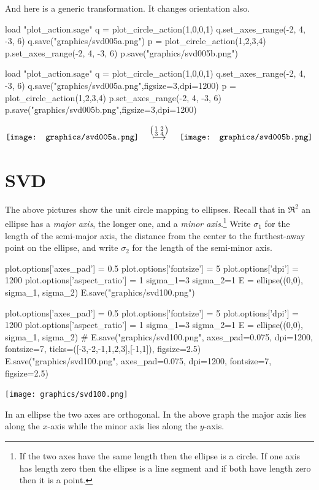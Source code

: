 And here is a generic transformation.
It changes orientation also.
\begin{sageoutput}[d,0,4;d,5,7]
load "plot_action.sage"
q = plot_circle_action(1,0,0,1) 
q.set_axes_range(-2, 4, -3, 6) 
q.save("graphics/svd005a.png")
p = plot_circle_action(1,2,3,4) 
p.set_axes_range(-2, 4, -3, 6) 
p.save("graphics/svd005b.png")
\end{sageoutput}
\begin{sagesilent}
load "plot_action.sage"
q = plot_circle_action(1,0,0,1) 
q.set_axes_range(-2, 4, -3, 6) 
q.save("graphics/svd005a.png",figsize=3,dpi=1200)
p = plot_circle_action(1,2,3,4) 
p.set_axes_range(-2, 4, -3, 6) 
p.save("graphics/svd005b.png",figsize=3,dpi=1200)
\end{sagesilent}
\begin{equation*}
  \vcenteredhbox{\texttt{[image: graphics/svd005a.png]}}
  \quad\mapsunder{\big (\begin{smallmatrix} 1 &2 \\ 3 &4 \end{smallmatrix}\big )}\quad
  \vcenteredhbox{\texttt{[image: graphics/svd005b.png]}}
\end{equation*}



\section{SVD}
The above pictures show the unit circle mapping to ellipses.
Recall that in $\Re^2$ an ellipse has a \textit{major axis}, 
the longer one, and a 
\textit{minor axis}.\footnote{If the two axes have the same length 
then the ellipse is a circle.
If one axis has length zero then the ellipse is a line segment 
and if both have length zero then it is a point.}
Write $\sigma_1$ for the length of the semi-major axis, 
the distance from the center to the furthest-away point on the ellipse,
and write $\sigma_2$ for the length of the semi-minor axis.
\begin{sageoutput}[d,0,4]
plot.options['axes_pad'] = 0.5
plot.options['fontsize'] = 5
plot.options['dpi'] = 1200
plot.options['aspect_ratio'] = 1
sigma_1=3
sigma_2=1
E = ellipse((0,0), sigma_1, sigma_2)
E.save("graphics/svd100.png")
\end{sageoutput}
\begin{sagesilent}
plot.options['axes_pad'] = 0.5
plot.options['fontsize'] = 5
plot.options['dpi'] = 1200
plot.options['aspect_ratio'] = 1
sigma_1=3
sigma_2=1
E = ellipse((0,0), sigma_1, sigma_2)
# E.save("graphics/svd100.png", axes_pad=0.075, dpi=1200, fontsize=7, ticks=([-3,-2,-1,1,2,3],[-1,1]), figsize=2.5)
E.save("graphics/svd100.png", axes_pad=0.075, dpi=1200, fontsize=7, figsize=2.5)
\end{sagesilent}
\begin{center}
  \texttt{[image: graphics/svd100.png]}
\end{center}
In an ellipse the two axes are orthogonal.
In the above graph the major axis lies along the $x$-axis while the
minor axis lies along the $y$-axis.

